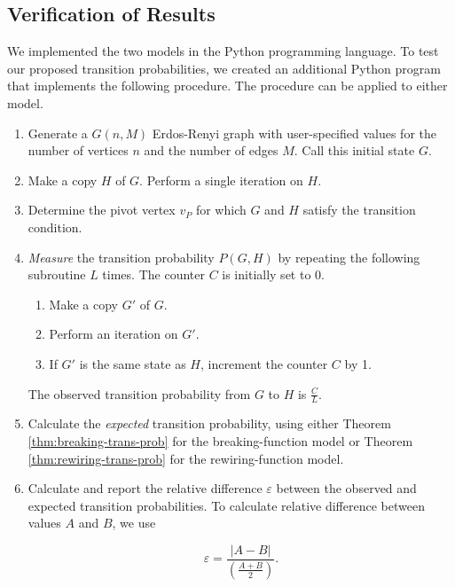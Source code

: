 \documentclass[a4paper,10pt]{article}
\begin{document}
\subsection{Verification of Results}

We implemented the two models in the Python programming language. To test our proposed transition probabilities, we created an additional Python program that implements the following procedure. The procedure can be applied to either model.

\begin{enumerate}
 \item Generate a $G(n, M)$ Erdos-Renyi graph with user-specified values for the number of vertices $n$ and the number of edges $M$. Call this initial state $G$.
 \item Make a copy $H$ of $G$. Perform a single iteration on $H$.
 \item Determine the pivot vertex $v_P$ for which $G$ and $H$ satisfy the transition condition.
 \item \emph{Measure} the transition probability $P(G, H)$ by repeating the following subroutine $L$ times. The counter $C$ is initially set to 0.

    \begin{enumerate}
      \item Make a copy $G'$ of $G$.
      \item Perform an iteration on $G'$.
      \item If $G'$ is the same state as $H$, increment the counter $C$ by 1.
    \end{enumerate}

  The observed transition probability from $G$ to $H$ is $\frac{C}{L}$.

 \item Calculate the \emph{expected} transition probability, using either Theorem \ref{thm:breaking-trans-prob} for the breaking-function model or Theorem \ref{thm:rewiring-trans-prob} for the rewiring-function model.

 \item Calculate and report the relative difference $\varepsilon$ between the observed and expected transition probabilities. To calculate relative difference between values $A$ and $B$, we use

 \begin{equation}
  \label{eqn:relative-difference}
  \varepsilon = \frac{|A - B|}{(\frac{A + B}{2})}.
 \end{equation}

\end{enumerate}
\end{document}
